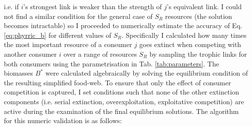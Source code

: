 \documentclass[a4paper]{report}
\begin{document}
i.e. if $i$'s strongest link is weaker than the strength of $j$'s equivalent link. I could not find a similar condition for the general case of  $S_R$ resources (the solution becomes intractable) so I proceeded to numerically estimate the accuracy of Eq. \eqref{eq:phyrric_b} for different values of $S_R$. Specifically I calculated how many times the most important resource of a consumer $j$ goes extinct when competing with another consumer $i$ over a range of resources $S_R$ by sampling the trophic links for both consumers using the parametrisation in Tab. \ref{tab:parameters}. The biomasses $B^*$ were calculated algebraically by solving the equilibrium condition of the resulting simplified food-web. To ensure that only the effect of consumer competition is captured, I set conditions such that none of the other extinction components (i.e. serial extinction, overexploitation, exploitative competition) are active during the examination of the final equilibrium solutions. The algorithm for this numeric validation is as follows:
\end{document}
